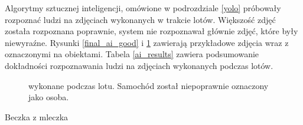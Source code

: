 Algorytmy sztucznej inteligencji, omówione w podrozdziale \ref{yolo} 
próbowały rozpoznać ludzi na zdjęciach wykonanych w trakcie lotów.
Większość zdjęć została rozpoznana poprawnie, system nie rozpoznawał
głównie zdjęć, które były niewyraźne. Rysunki \ref{final_ai_good} i \ref{final_ai_bad}
zawierają przykładowe zdjęcia wraz z oznaczonymi na obiektami.
Tabela \ref{ai_results} zawiera podsumowanie dokładności rozpoznawania
ludzi na zdjęciach wykonanych podczas lotów.

\begin{figure}[H]
	\centering

    \caption{
         wykonane podczas lotu. Samochód został niepoprawnie oznaczony jako osoba.
    }
	\label{final_ai_bad}
\end{figure}


Beczka z mleczka


